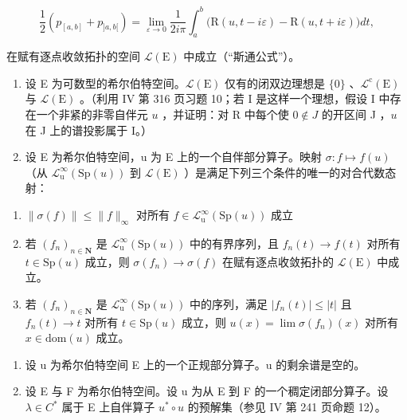 \[
\frac {1}{2} (p _ {[ a, b ]} + p _ {] a, b [}) = \lim _ {\varepsilon \rightarrow 0} \frac {1}{2 i \pi} \int_ {a} ^ {b} \big (\mathrm{R} (u, t - i \varepsilon) - \mathrm{R} (u, t + i \varepsilon) \big) d t,
\]

在赋有逐点收敛拓扑的空间 \(\mathcal{L}(\mathrm{E})\) 中成立（“斯通公式”）。

\begin{enumerate}
\def\labelenumi{\arabic{enumi})}
\setcounter{enumi}{2}
\item
  设 E 为可数型的希尔伯特空间。\(\mathcal{L}(\mathrm{E})\) 仅有的闭双边理想是 \(\{0\}\) 、\(\mathcal{L}^{\mathrm{c}}(\mathrm{E})\) 与 \(\mathcal{L}(\mathrm{E})\) 。（利用 IV 第 316 页习题 10；若 I 是这样一个理想，假设 I 中存在一个非紧的非零自伴元 \(u\) ，并证明：对 R 中每个使 \(0 \notin J\) 的开区间 J ，\(u\) 在 J 上的谱投影属于 I。）
\item
  设 E 为希尔伯特空间，u 为 E 上的一个自伴部分算子。映射 \(\sigma\colon f\mapsto f(u)\) （从 \(\mathcal{L}_{\mathrm{u}}^{\infty}(\mathrm{Sp}(u))\) 到 \(\mathcal{L}(\mathrm{E})\) ）是满足下列三个条件的唯一的对合代数态射：
\end{enumerate}

\begin{enumerate}
\def\labelenumi{(\roman{enumi})}
\item
  \(\| \sigma (f)\| \leqslant \| f\|_{\infty}\) 对所有 \(f\in \mathcal{L}_{\mathrm{u}}^{\infty}(\mathrm{Sp}(u))\) 成立
\item
  若 \((f_n)_{n\in \mathbf{N}}\) 是 \(\mathcal{L}_{\mathrm{u}}^{\infty}(\mathrm{Sp}(u))\) 中的有界序列，且 \(f_{n}(t)\to f(t)\) 对所有 \(t\in \mathrm{Sp}(u)\) 成立，则 \(\sigma (f_n)\rightarrow \sigma (f)\) 在赋有逐点收敛拓扑的 \(\mathcal{L}(\mathrm{E})\) 中成立。
\item
  若 \((f_n)_{n\in \mathbf{N}}\) 是 \(\mathcal{L}_{\mathrm{u}}^{\infty}(\mathrm{Sp}(u))\) 中的序列，满足 \(|f_n(t)|\leqslant |t|\) 且 \(f_{n}(t)\to t\) 对所有 \(t\in \mathrm{Sp}(u)\) 成立，则 \(u(x) = \lim \sigma (f_n)(x)\) 对所有 \(x\in \mathrm{dom}(u)\) 成立。
\end{enumerate}

\begin{enumerate}
\def\labelenumi{\arabic{enumi})}
\setcounter{enumi}{4}
\item
  设 u 为希尔伯特空间 E 上的一个正规部分算子。u 的剩余谱是空的。
\item
  设 E 与 F 为希尔伯特空间。设 u 为从 E 到 F 的一个稠定闭部分算子。设 \(\lambda \in C^{*}\) 属于 E 上自伴算子 \(u^{*} \circ u\) 的预解集（参见 IV 第 241 页命题 12）。
\end{enumerate}

